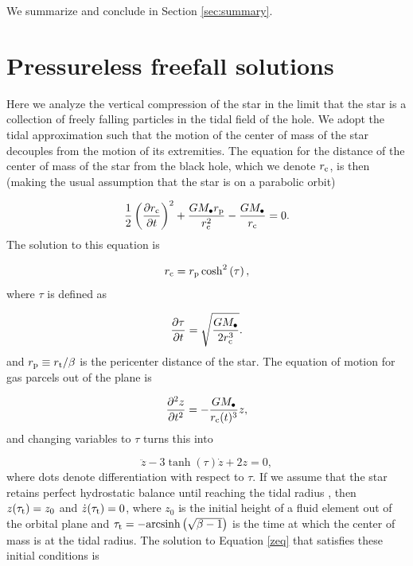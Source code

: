 \documentclass[twocolumn]{aastex62}
\begin{document}
We summarize and conclude in Section \ref{sec:summary}.


\section{Pressureless freefall solutions}
\label{sec:pressureless}
Here we analyze the vertical compression of the star in the limit that the star is a collection of freely falling particles in the tidal field of the hole. We adopt the tidal approximation such that the motion of the center of mass of the star decouples from the motion of its extremities. The equation for the distance of the center of mass of the star from the black hole, which we denote $r_{\rm c}$, is then (making the usual assumption that the star is on a parabolic orbit)

\begin{equation}
\frac{1}{2}\left(\frac{\partial r_{\rm c}}{\partial t}\right)^{2}+\frac{GM_{\bullet}r_{\rm p}}{r_{\rm c}^2}-\frac{GM_{\bullet}}{r_{\rm c}} = 0. \label{rceq}
\end{equation}
The solution to this equation is 

\begin{equation}
r_{\rm c} = r_{\rm p}\cosh^2\left(\tau\right), \label{uceq}
\end{equation}
where $\tau$ is defined as 

\begin{equation}
\frac{\partial \tau}{\partial t} = \sqrt{\frac{GM_{\bullet}}{2r_{\rm c}^{3}}}.
\end{equation}
and $r_{\rm p} \equiv r_{\rm t}/\beta$ is the pericenter distance of the star. The equation of motion for gas parcels out of the plane is 

\begin{equation}
\frac{\partial^2z}{\partial t^2} = -\frac{GM_{\bullet}}{r_{\rm c}(t)^3}z,
\end{equation}
and changing variables to $\tau$ turns this into

\begin{equation}
\ddot{z}-3\tanh(\tau)\dot{z}+2z = 0, \label{zeq}
\end{equation}
where dots denote differentiation with respect to $\tau$. If we assume that the star retains perfect hydrostatic balance until reaching the tidal radius \citep{lacy82, Stone:2013aa}, then $z(\tau_{\rm t}) = z_0$ and $\dot{z}(\tau_{\rm t}) = 0$, where $z_0$ is the initial height of a fluid element out of the orbital plane and $\tau_{\rm t} = -{\rm arcsinh}\left(\sqrt{\beta-1}\right)$ is the time at which the center of mass is at the tidal radius. The solution to Equation \eqref{zeq} that satisfies these initial conditions is
\end{document}
